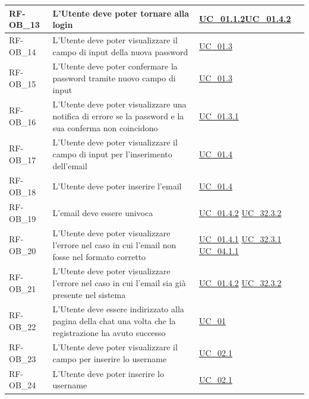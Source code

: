 \begin{longtable}{|>{\raggedright}p{}|>{\raggedright\arraybackslash}p{}|>{\raggedright\arraybackslash}p{}|}
	\hline
	RF-OB\_13 \hypertarget{rf-ob_13} & L'Utente deve poter tornare alla login & \hyperref[uc_01.1.2]{UC\_01.1.2}\newline \hyperref[uc_01.4.2]{UC\_01.4.2} \\
	\hline
	RF-OB\_14 \hypertarget{rf-ob_14} & L'Utente deve poter visualizzare il campo di input della nuova password & \hyperref[uc_01.3]{UC\_01.3} \\
	\hline
	RF-OB\_15 \hypertarget{rf-ob_15} & L'Utente deve poter confermare la password tramite nuovo campo di input & \hyperref[uc_01.3]{UC\_01.3} \\
	\hline
	RF-OB\_16 \hypertarget{rf-ob_16} & L'Utente deve poter visualizzare una notifica di errore se la password e la sua conferma non coincidono & \hyperref[uc_01.3.1]{UC\_01.3.1} \\
	\hline
	RF-OB\_17 \hypertarget{rf-ob_17} & L'Utente deve poter visualizzare il campo di input per l'inserimento dell'email & \hyperref[uc_01.4]{UC\_01.4} \\
	\hline
	RF-OB\_18 \hypertarget{rf-ob_18} & L'Utente deve poter inserire l'email & \hyperref[uc_01.4]{UC\_01.4} \\
	\hline
	RF-OB\_19 \hypertarget{rf-ob_19} & L'email deve essere univoca & \hyperref[uc_01.4.2]{UC\_01.4.2} \newline \hyperref[uc_32.3.2]{UC\_32.3.2} \\
	\hline
	RF-OB\_20 \hypertarget{rf-ob_20} & L'Utente deve poter visualizzare l'errore nel caso in cui l'email non fosse nel formato corretto & \hyperref[uc_01.4.1]{UC\_01.4.1} \newline \hyperref[uc_32.3.1]{UC\_32.3.1} \newline \hyperref[uc_04.1.1]{UC\_04.1.1}\\
	\hline
	RF-OB\_21 \hypertarget{rf-ob_21} & L'Utente deve poter visualizzare l'errore nel caso in cui l'email sia già presente nel sistema & \hyperref[uc_01.4.2]{UC\_01.4.2} \newline \hyperref[uc_32.3.2]{UC\_32.3.2}\\
	\hline
	RF-OB\_22 \hypertarget{rf-ob_22} & L'Utente deve essere indirizzato alla pagina della chat una volta che la registrazione ha avuto successo & \hyperref[uc_01]{UC\_01} \\
	\hline
	RF-OB\_23 \hypertarget{rf-ob_23} & L'Utente deve poter visualizzare il campo per inserire lo username & \hyperref[uc_02.1]{UC\_02.1} \\
	\hline
	RF-OB\_24 \hypertarget{rf-ob_24} & L'Utente deve poter inserire lo username & \hyperref[uc_02.1]{UC\_02.1} \\

\end{longtable}
